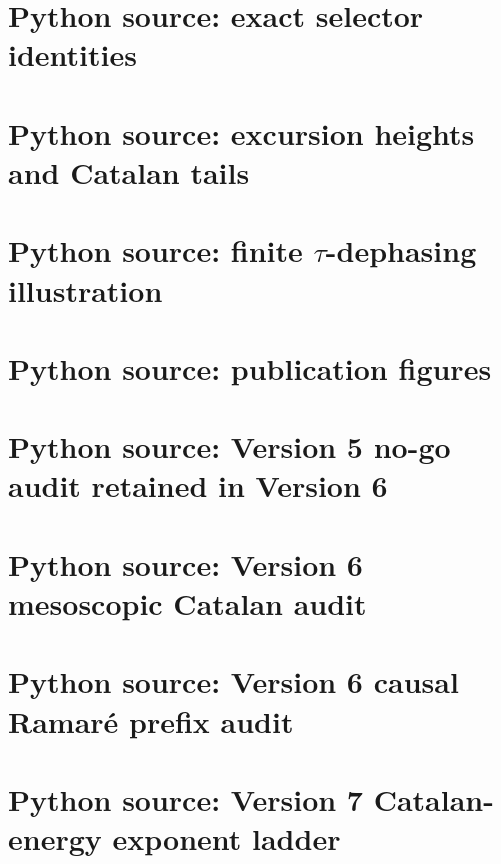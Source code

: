 \documentclass[11pt]{amsart}
\numberwithin{equation}{section}
\theoremstyle{plain}
\theoremstyle{definition}
\theoremstyle{remark}
\begin{document}
\section{Python source: exact selector identities}


\section{Python source: excursion heights and Catalan tails}


\section{Python source: finite $\tau$-dephasing illustration}


\section{Python source: publication figures}


\section{Python source: Version 5 no-go audit retained in Version 6}


\section{Python source: Version 6 mesoscopic Catalan audit}


\section{Python source: Version 6 causal Ramar\'e prefix audit}


\section{Python source: Version 7 Catalan-energy exponent ladder}

\end{document}
